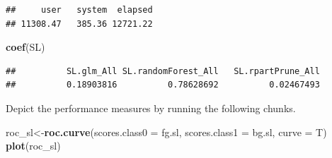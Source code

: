 \documentclass[]{article}
\newenvironment{Shaded}{\begin{snugshade}}{\end{snugshade}}
\newcommand{\CommentTok}[1]{\textcolor[rgb]{0.56,0.35,0.01}{\textit{#1}}}
\newcommand{\DataTypeTok}[1]{\textcolor[rgb]{0.13,0.29,0.53}{#1}}
\newcommand{\DecValTok}[1]{\textcolor[rgb]{0.00,0.00,0.81}{#1}}
\newcommand{\KeywordTok}[1]{\textcolor[rgb]{0.13,0.29,0.53}{\textbf{#1}}}
\newcommand{\NormalTok}[1]{#1}
\newcommand{\OperatorTok}[1]{\textcolor[rgb]{0.81,0.36,0.00}{\textbf{#1}}}
\newcommand{\OtherTok}[1]{\textcolor[rgb]{0.56,0.35,0.01}{#1}}
\newcommand{\StringTok}[1]{\textcolor[rgb]{0.31,0.60,0.02}{#1}}
\begin{document}
\begin{verbatim}
##     user   system  elapsed 
## 11308.47   385.36 12721.22
\end{verbatim}

\begin{Shaded}
\begin{Highlighting}[]
\KeywordTok{coef}\NormalTok{(SL)}
\end{Highlighting}
\end{Shaded}

\begin{verbatim}
##          SL.glm_All SL.randomForest_All   SL.rpartPrune_All 
##          0.18903816          0.78628692          0.02467493
\end{verbatim}

Depict the performance measures by running the following chunks.

\begin{Shaded}
\end{Shaded}

\begin{Shaded}
\end{Shaded}

\begin{Shaded}
\begin{Highlighting}[]
\NormalTok{roc_sl<-}\KeywordTok{roc.curve}\NormalTok{(}\DataTypeTok{scores.class0 =}\NormalTok{ fg.sl,}
                  \DataTypeTok{scores.class1 =}\NormalTok{ bg.sl,}
                  \DataTypeTok{curve =}\NormalTok{ T)}
\KeywordTok{plot}\NormalTok{(roc_sl) }
\end{Highlighting}
\end{Shaded}
\end{document}

